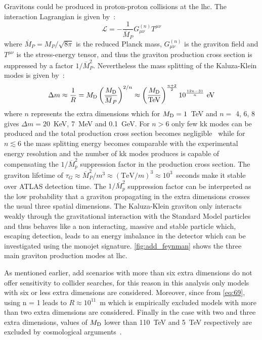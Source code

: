Gravitons could be produced in proton-proton collisions at the \gls{lhc}. The
interaction Lagrangian is given by~\cite{ADDPhenomenology}:
\begin{equation}
  \label{eq:114}
  \mathcal{L} = - \frac{1}{\overbar{M}_P} G^{(n)}_{\mu\nu} T^{\mu\nu}
\end{equation}
where $\overbar{M}_P = M_P/\sqrt{8 \pi}$ is the reduced Planck mass,
$G^{(n)}_{\mu\nu}$ is the graviton field and $T^{\mu\nu}$ is the stress-energy
tensor, and thus the graviton production cross section is suppressed by a factor
$1/\overbar{M}^2_P$. Nevertheless the mass splitting of the Kaluza-Klein modes
is given by~\cite{ADDPhenomenology}:
\begin{equation}
  \label{eq:115}
  \Delta m \approx \frac{1}{R} = \md \left( \frac{\md}{\overbar{M}_P}
  \right)^{2/n} \approx \left( \frac{\md}{\mathrm{TeV}} \right)^{\frac{n +
  2}{2}} 10^{\frac{12 n - 31}{n}}~\mathrm{eV}
\end{equation}
where $n$ represents the extra dimensions which for $M_\mathrm{D} = 1$~TeV and $n =$ 4,
6, 8 gives $\Delta m = 20$~KeV, 7~MeV and 0.1~GeV. For $n > 6$ only few \gls{kk}
modes can be produced and the total production cross section becomes
negligible~\cite{ADDPhenomenology} while for $n \lesssim 6$ the mass splitting
energy becomes comparable with the experimental energy resolution and the number
of \gls{kk} modes produces is capable of compensating the $1/\overbar{M}^2_p$
suppression factor in the production cross section. The graviton lifetime of
$\tau_G \approx \overbar{M}^2_P/m^3 \approx (\mathrm{TeV}/m)^3 \approx
10^3$~seconds make it stable over ATLAS detection time. The $1/\overbar{M}^2_p$
suppression factor can be interpreted as the low probability that a graviton
propagating in the extra dimensions crosses the usual three spatial
dimensions. The Kaluza-Klein graviton only interacts weakly through the
gravitational interaction with the Standard Model particles and thus behaves
like a non interacting, massive and stable particle which, escaping detection,
leads to an energy imbalance in the detector which can be investigated using the
monojet signature. \cref{fig:add_feynman} shows the three main graviton
production modes at \gls{lhc}.

As mentioned earlier, \gls{add} scenarios with more than six extra dimensions do
not offer sensitivity to collider searches, for this reason in this analysis
only models with six or less extra dimensions are considered. Moreover, since
from \cref{eq:69}, using n = 1 leads to $R \approx 10^{11}$~m which is
empirically excluded models with more than two extra dimensions are
considered. Finally in the case with two and three extra dimensions, values of
$M_\mathrm{D}$ lower than 110~TeV and 5~TeV respectively are excluded by cosmological
arguments~\cite{ADDCosmology}.

